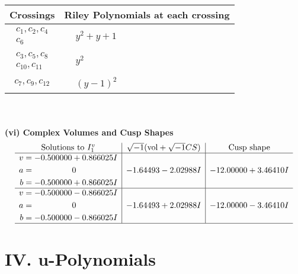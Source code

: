 \documentclass[1p]{elsarticle_modified}
\theoremstyle{definition}
\newcommand{\I}{\sqrt{-1}}
\begin{document}
\begin{tabular}{m{50pt}|m{274pt}}
Crossings & \hspace{64pt}Riley Polynomials at each crossing \\
\hline $$\begin{aligned}c_{1},c_{2},c_{4}\\c_{6}\end{aligned}$$&$\begin{aligned}
&y^2+y+1
\end{aligned}$\\
\hline $$\begin{aligned}c_{3},c_{5},c_{8}\\c_{10},c_{11}\end{aligned}$$&$\begin{aligned}
&y^2
\end{aligned}$\\
\hline $$\begin{aligned}c_{7},c_{9},c_{12}\end{aligned}$$&$\begin{aligned}
&(y-1)^2
\end{aligned}$\\
\hline
\end{tabular}\\~\\
\newpage\flushleft \textbf{(vi) Complex Volumes and Cusp Shapes}
$$\begin{array}{c|c|c}  
\text{Solutions to }I^v_{1}& \I (\text{vol} + \sqrt{-1}CS) & \text{Cusp shape}\\
 \hline 
\begin{aligned}
v &= -0.500000 + 0.866025 I \\
a &= \phantom{-0.000000 } 0 \\
b &= -0.500000 + 0.866025 I\end{aligned}
 & -1.64493 - 2.02988 I & -12.00000 + 3.46410 I \\ \hline\begin{aligned}
v &= -0.500000 - 0.866025 I \\
a &= \phantom{-0.000000 } 0 \\
b &= -0.500000 - 0.866025 I\end{aligned}
 & -1.64493 + 2.02988 I & -12.00000 - 3.46410 I\\
 \hline 
 \end{array}$$\newpage
\newpage\renewcommand{\arraystretch}{1}
\centering \section*{ IV. u-Polynomials}
\end{document}
